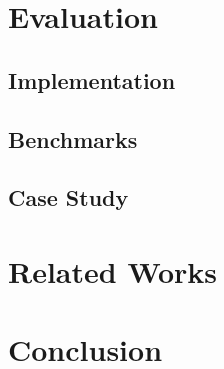\documentclass[11pt,a4paper]{article}
\begin{document}
%
%
%
\section{Evaluation}
\subsection{Implementation}
%
\subsection{Benchmarks}

\subsection{Case Study}

\section{Related Works}

\section{Conclusion}
\end{document}
